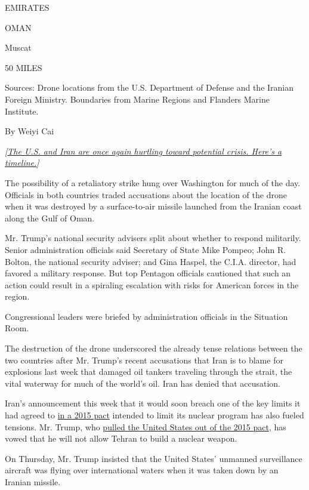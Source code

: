 EMIRATES

OMAN

Muscat

50 MILES

Sources: Drone locations from the U.S. Department of Defense and the
Iranian Foreign Ministry. Boundaries from Marine Regions and Flanders
Marine Institute.

By Weiyi Cai

\emph{{[}}\href{https://www.nytimes.com/2019/06/14/us/politics/us-iran.html?action=click\&module=Top\%20Stories\&pgtype=Homepage}{\emph{The
U.S. and Iran are once again hurtling toward potential crisis. Here's a
timeline.}}\emph{{]}}

The possibility of a retaliatory strike hung over Washington for much of
the day. Officials in both countries traded accusations about the
location of the drone when it was destroyed by a surface-to-air missile
launched from the Iranian coast along the Gulf of Oman.

Mr. Trump's national security advisers split about whether to respond
militarily. Senior administration officials said Secretary of State Mike
Pompeo; John R. Bolton, the national security adviser; and Gina Haspel,
the C.I.A. director, had favored a military response. But top Pentagon
officials cautioned that such an action could result in a spiraling
escalation with risks for American forces in the region.

Congressional leaders were briefed by administration officials in the
Situation Room.

The destruction of the drone underscored the already tense relations
between the two countries after Mr. Trump's recent accusations that Iran
is to blame for explosions last week that damaged oil tankers traveling
through the strait, the vital waterway for much of the world's oil. Iran
has denied that accusation.

Iran's announcement this week that it would soon breach one of the key
limits it had agreed to
\href{https://www.nytimes.com/2015/07/15/world/middleeast/iran-nuclear-deal-is-reached-after-long-negotiations.html}{in
a 2015 pact} intended to limit its nuclear program has also fueled
tensions. Mr. Trump, who
\href{https://www.nytimes.com/2018/05/08/world/middleeast/trump-iran-nuclear-deal.html}{pulled
the United States out of the 2015 pact}, has vowed that he will not
allow Tehran to build a nuclear weapon.

On Thursday, Mr. Trump insisted that the United States' unmanned
surveillance aircraft was flying over international waters when it was
taken down by an Iranian missile.

